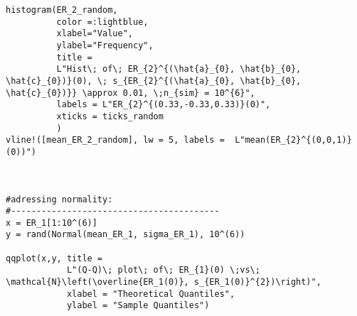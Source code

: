 \begin{verbatim}
histogram(ER_2_random, 
          color =:lightblue, 
          xlabel="Value", 
          ylabel="Frequency", 
          title = 
          L"Hist\; of\; ER_{2}^{(\hat{a}_{0}, \hat{b}_{0}, \hat{c}_{0})}(0), \; s_{ER_{2}^{(\hat{a}_{0}, \hat{b}_{0}, \hat{c}_{0})}} \approx 0.01, \;n_{sim} = 10^{6}", 
          labels = L"ER_{2}^{(0.33,-0.33,0.33)}(0)", 
          xticks = ticks_random
          )
vline!([mean_ER_2_random], lw = 5, labels =  L"mean(ER_{2}^{(0,0,1)}(0))")



#adressing normality:
#-----------------------------------------
x = ER_1[1:10^(6)]
y = rand(Normal(mean_ER_1, sigma_ER_1), 10^(6))

qqplot(x,y, title =  
            L"(Q-Q)\; plot\; of\; ER_{1}(0) \;vs\; \mathcal{N}\left(\overline{ER_1(0)}, s_{ER_1(0)}^{2})\right)", 
            xlabel = "Theoretical Quantiles", 
            ylabel = "Sample Quantiles")
\end{verbatim}



%


%


